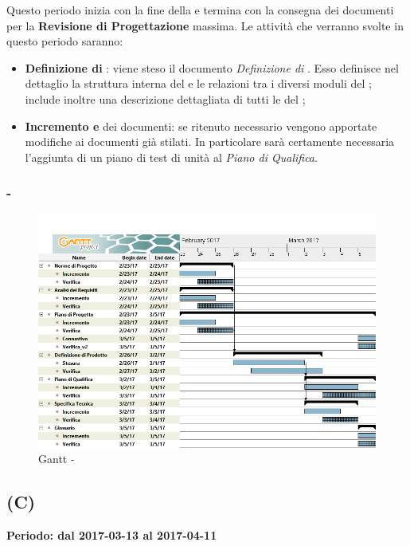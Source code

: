 \documentclass[./PianoDiProgetto.tex]{subfiles}
\begin{document}
  Questo periodo inizia con la fine della \PerPA{} e termina con la consegna dei documenti per la \textbf{Revisione di Progettazione} massima. Le attività che verranno svolte in questo periodo saranno:
  \begin{itemize}
    \item \textbf{Definizione di }: viene steso il documento \textit{Definizione di }. Esso definisce nel dettaglio la struttura interna del  e le relazioni tra i diversi moduli del ; include inoltre una descrizione dettagliata di tutti le  del ;
    \item \textbf{Incremento e } dei documenti: se ritenuto necessario vengono apportate modifiche ai documenti già stilati. In particolare sarà certamente necessaria l'aggiunta di un piano di test di unità al \textit{Piano di Qualifica}.
  \end{itemize}

  \newpage
  \subsubsection{ - \PerPD}
    \begin{figure}[!h]
    \centering
    \includegraphics[width=\textwidth]{images/PD}
    \caption{Gantt - \PerPD}
    \end{figure}

  \subsection{\PerC{} (C)}
  \textbf{Periodo: dal 2017-03-13 al 2017-04-11}
\end{document}
